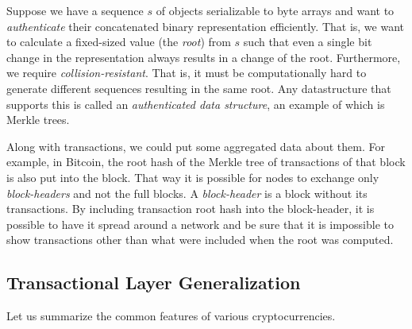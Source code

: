 \documentclass[]{report}   %
\begin{document}
Suppose we have a sequence $s$ of objects serializable to byte arrays and want to \textit{authenticate} their concatenated binary representation efficiently. That is, we want to calculate a fixed-sized value (the {\em root}) from $s$ such that even a single bit change in the representation always results in a change of the root. Furthermore, we require {\em collision-resistant}. That is, it must be computationally hard to generate different sequences resulting in the same root. Any datastructure that supports this is called an {\em authenticated data structure}, an example of which is Merkle trees.

Along with transactions, we could put some aggregated data about them. For example, in Bitcoin, the root hash of the Merkle tree of transactions of that block is also put into the block. That way it is possible for nodes to exchange only {\em block-headers} and not the full blocks. A \textit{block-header} is a block without its transactions. 
By including transaction root hash into the block-header, it is possible to have it spread around a network and be sure that it is impossible to show transactions other than what were included when the root was computed. 


\subsection{Transactional Layer Generalization}

Let us summarize the common features of various cryptocurrencies.
\end{document}
